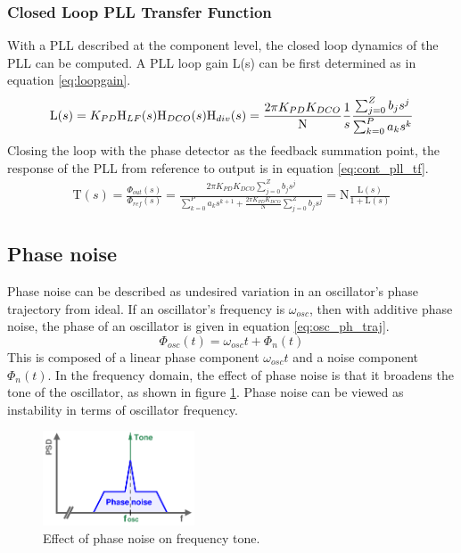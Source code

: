 		\subsubsection{Closed Loop PLL Transfer Function}\label{cont_pll_tf}
			With a PLL described at the component level, the closed loop dynamics of the PLL can be computed. A PLL loop gain L(s) can be first determined as in equation \ref{eq:loopgain}. 
			\begin{equation}\label{eq:loopgain}
				\mathrm{L}(s) = K_{PD}\textnormal{H}_{LF}(s)\textnormal{H}_{DCO}(s)\textnormal{H}_{div}(s) = \frac{2\pi K_{PD}K_{DCO}}{\mathrm{N}}\frac{1}{s}\frac{\sum_{j=0}^Z b_js^j}{\sum_{k=0}^P a_ks^k}
			\end{equation}
			Closing the loop with the phase detector as the feedback summation point, the response of the PLL from reference to output is in equation \ref{eq:cont_pll_tf}.
			\begin{align} \label{eq:cont_pll_tf}
				\mathrm{T}(s) = \frac{\Phi_{out}(s)}{\Phi_{ref}(s)} = \frac{2\pi K_{PD}K_{DCO}\sum_{j=0}^Z b_js^j}{\sum_{k=0}^P a_ks^{k+1} + \frac{2\pi K_{PD}K_{DCO}}{\mathrm{N}}\sum_{j=0}^Z b_js^j} = \mathrm{N}\frac{\mathrm{L}(s)}{1 + \mathrm{L}(s)}
			\end{align}



	\subsection{Phase noise}
		Phase noise can be described as undesired variation in an oscillator's phase trajectory from ideal. If an oscillator's frequency is $\omega_{osc}$, then with additive phase noise, the phase of an oscillator is given in equation \ref{eq:osc_ph_traj}. 
		\begin{equation}\label{eq:osc_ph_traj}
			\Phi_{osc}(t) = \omega_{osc}t + \Phi_n(t)
		\end{equation}
		This is composed of a linear phase component $\omega_{osc}t$ and a noise component $\Phi_n(t)$. In the frequency domain, the effect of phase noise is that it broadens the tone of the oscillator, as shown in figure \ref{fig:phase_noise_psd}. Phase noise can be viewed as instability in terms of oscillator frequency.
		\begin{figure}[htb!]
	        \centering
	        \includegraphics[width=0.4\textwidth, angle=0]{./figs/theory/phase_noise_psd}
		    \caption{Effect of phase noise on frequency tone.}
		    \label{fig:phase_noise_psd}
		\end{figure}

